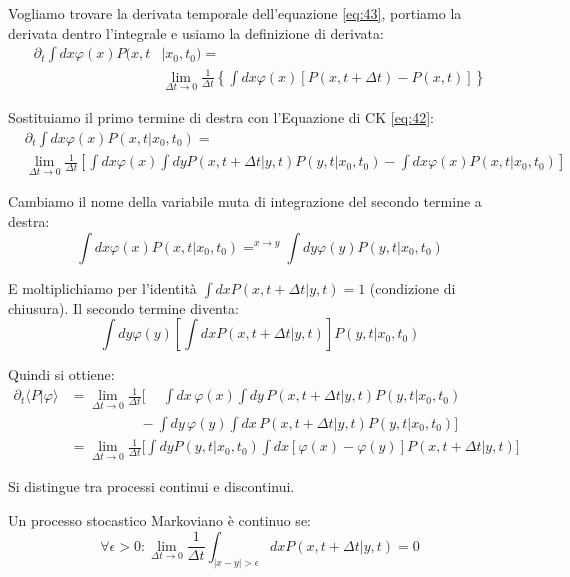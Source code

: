 Vogliamo trovare la derivata temporale dell'equazione \ref{eq:43}, portiamo la derivata dentro l'integrale e usiamo la definizione di derivata:
\begin{align}
\partial_t \int dx \varphi(x) P(x,t&|x_0,t_0) = \nonumber \\ &\lim_{\Delta t \rightarrow 0} \frac{1}{\Delta t}  \left \{ \int dx \varphi(x) \left[ P(x,t+\Delta t)-  P(x,t) \right] \right\}
\end{align}

Sostituiamo il primo termine di destra con l'Equazione di CK \ref{eq:42}:
\begin{align*}
&\partial_t \int dx \varphi(x) P(x,t|x_0,t_0) =  \\ &\lim_{\Delta t \rightarrow 0} \frac{1}{\Delta t} \left[ \int dx \varphi(x) \int dy P(x,t+\Delta t|y,t)P(y,t|x_0,t_0) - \int dx \varphi(x) P(x,t|x_0,t_0) \right] \nonumber
\end{align*}

Cambiamo il nome della variabile muta di integrazione del secondo termine a destra:
\begin{equation*}
\int dx \varphi(x) P(x,t|x_0,t_0) =^{x \to y} \int dy \varphi(y) P(y,t|x_0,t_0) \end{equation*}

E moltiplichiamo per l'identità $\int dx P(x,t+\Delta t|y,t) = 1$ (condizione di chiusura). Il secondo termine diventa:
\begin{equation*}\int dy  \varphi(y)  \left[ \int dx P(x,t+\Delta t|y,t) \right]P(y,t|x_0,t_0) \end{equation*}

Quindi si ottiene:
\begin{equation}
\begin{aligned}
\partial_t \langle P|\varphi \rangle &= \lim_{\Delta t \rightarrow 0} \frac{1}{\Delta t} \Biggl[
\phantom{-} \int dx \, \varphi(x) \int dy \, P(x,t+\Delta t|y,t)P(y,t|x_0,t_0) \\
& \quad \quad\quad\quad\quad - \int dy \, \varphi(y) \int dx \, P(x,t+\Delta t|y,t) P(y,t|x_0,t_0)
\Biggr] \\ &= \lim_{\Delta t \rightarrow 0} \frac{1}{\Delta t} \Biggl[ \int dy P(y,t|x_0,t_0) \int dx [\varphi(x)-\varphi(y)] P(x,t+\Delta t|y,t)\Biggr]
\end{aligned}
\label{eq:45}
\end{equation}

Si distingue tra processi continui e discontinui.

\begin{tcolorbox}[
    colback=colorA!5,      
    colframe=colorA,       
    title={Definizione},
    fonttitle=\bfseries\sffamily,
    arc=3mm,               
    boxrule=1.2pt,         
    halign title=flush left
]
Un processo stocastico Markoviano è continuo se:
\begin{equation}
\forall \epsilon > 0: \lim_{\Delta t \rightarrow 0} \frac{1}{\Delta t} \int_{|x-y|>\epsilon} dx P(x,t+\Delta t|y,t) = 0
\end{equation}
\end{tcolorbox}

